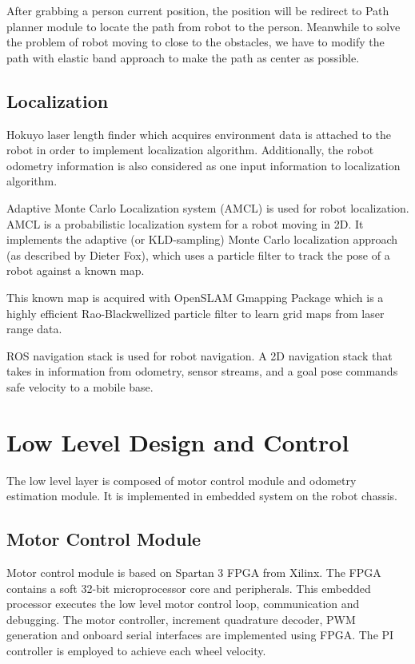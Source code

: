 \documentclass{llncs}
\begin{document}
After grabbing a person current position, the position will be redirect to Path planner module to locate the path from robot to the person. Meanwhile to solve the problem of robot moving to close to the obstacles, we have to modify the path with elastic band approach to make the path as center as possible.

\subsection{Localization}

Hokuyo laser length finder which acquires environment data is attached to the robot in order to implement localization algorithm. Additionally, the robot odometry information is also considered as one input information to localization algorithm.

Adaptive Monte Carlo Localization system (AMCL) is used for robot localization. AMCL is a probabilistic localization system for a robot moving in 2D. It implements the adaptive (or KLD-sampling) Monte Carlo localization approach (as described by Dieter Fox), which uses a particle filter to track the pose of a robot against a known map.

This known map is acquired with OpenSLAM Gmapping Package which is a highly efficient Rao-Blackwellized particle filter to learn grid maps from laser range data.

ROS navigation stack is used for robot navigation. A 2D navigation stack that takes in information from odometry, sensor streams, and a goal pose commands safe velocity to a mobile base.

\section{Low Level Design and Control}

The low level layer is composed of motor control module and odometry estimation module. It is implemented in embedded system on the robot chassis. 

\subsection{Motor Control Module}

Motor control module is based on Spartan 3 FPGA from Xilinx. The FPGA contains a soft 32-bit microprocessor core and peripherals. This embedded processor executes the low level motor control loop, communication and debugging. The motor controller, increment quadrature decoder, PWM generation and onboard serial interfaces are implemented using FPGA. The PI controller is employed to achieve each wheel velocity. 
\end{document}
